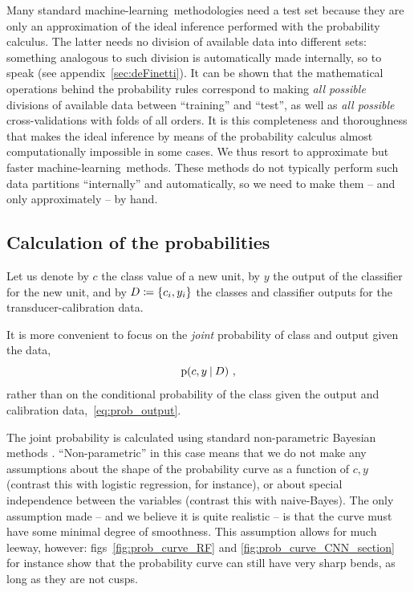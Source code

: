 \documentclass[\ifafour a4paper,12pt,\else a5paper,10pt,\fi%
onecolumn,oneside,article,%
british%
]{memoir}
\theoremstyle{remark}
\theoremstyle{innote}
\newcommand*{\defd}{\coloneqq}
\DeclarePairedDelimiter\set{\{}{\}} %
\newcommand*{\p}{\mathrm{p}}%
\renewcommand*{\|}[1][]{\nonscript\:#1\vert\nonscript\:\mathopen{}}
\newcommand*{\figs}{figs}%
\newcommand*{\eg}{{e.g.}}
\newcommand*{\ml}{machine-learning}
\begin{document}
Many standard \ml\ methodologies need a test set because they are only an approximation of the ideal inference performed with the probability calculus. The latter needs no division of available data into different sets: something analogous to such division is automatically made internally, so to speak (see appendix~\ref{sec:deFinetti}). It can be shown \autocites{portamana2019b,fongetal2020,wald1949}[many examples of this fact are scattered across the text by][]{jaynes1994_r2003} that the mathematical operations behind the probability rules correspond to making \emph{all possible} divisions of available data between \enquote{training} and \enquote{test}, as well as \emph{all possible} cross-validations with folds of all orders. It is this completeness and thoroughness that makes the ideal inference by means of the probability calculus almost computationally impossible in some cases. We thus resort to approximate but faster \ml\ methods. These methods do not typically perform such data partitions \enquote{internally} and automatically, so we need to make them -- and only approximately -- by hand.


\subsection{Calculation of the probabilities}
\label{sec:calculation_transducer}

Let us denote by $c$ the class value of a new unit, by $y$ the output of the classifier for the new unit, and by $D \defd \set{c_{i}, y_{i}}$ the classes and classifier outputs for the transducer-calibration data.

It is more convenient to focus on the \emph{joint} probability of class and output given the data,
\begin{equation}
  \label{eq:prob_output}
  \p(c, y \| D) \ ,
\end{equation}
rather than on the conditional probability of the class given the output and calibration data,~\eqref{eq:prob_output}.

The joint probability is calculated using standard non-parametric Bayesian methods \autocites[for introductions and reviews see \eg][]{walker2013,muelleretal2004b,hjort1996}. \enquote{Non-parametric} in this case means that we do not make any assumptions about the shape of the probability curve as a function of $c,y$ (contrast this with logistic regression, for instance), or about special independence between the variables (contrast this with naive-Bayes). The only assumption made -- and we believe it is quite realistic -- is that the curve must have some minimal degree of smoothness. This assumption allows for much leeway, however: \figs~\ref{fig:prob_curve_RF} and \ref{fig:prob_curve_CNN_section} for instance show that the probability curve can still have very sharp bends, as long as they are not cusps.
\end{document}
